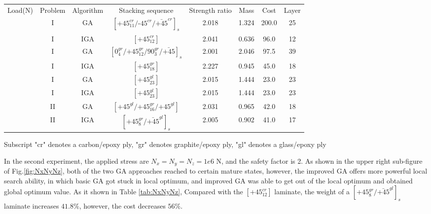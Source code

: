 \documentclass[smallextended]{svjour3}       %
\begin{document}
\begin{center}  
	\begin{tabular}{cccccccc}
	\toprule
	Load(N)                                                 &  Problem  &   Algorithm      & Stacking sequence                                    & Strength ratio  & Mass  &  Cost   & Layer    \\ 
	  &  I  & GA   &  $[\text{+}45_{11}^{cr}/\text{-}45^{cr}/\bar{\text{+}45}^{cr}]_s$                            & 2.018           & 1.324 &  200.0  & 25  \\
	                                                                             &  I  & IGA  &  $[\text{+}45_{12}^{cr}]$                            & 2.041           & 0.636 &  96.0  & 12  \\

																				 &  I  & GA   &  $[0_4^{gr}/\text{+}45_{12}^{gr}/90_3^{gr}/\bar{\text{+}45}]_s$                            & 2.001           & 2.046 &  97.5  & 39  \\
																				 &  I  & IGA  &  $[\text{+}45_{18}^{gr}]$                            & 2.227           & 0.945 &  45.0  & 18  \\
																				 &  I  & GA   &  $[\text{+}45_{23}^{gl}]$                            & 2.015           & 1.444 &  23.0  & 23  \\
																				 &  I  & IGA  &  $[\text{+}45_{23}^{gl}]$                            & 2.015           & 1.444 &  23.0  & 23  \\
																				 &  II &  GA  &  $[\text{+}45^{gl}/\text{+}45_{16}^{gr}/\text{+}45^{gl}]$          & 2.031           & 0.965 &  42.0  & 18 \\
																				 &  II & IGA  &  $[\text{+}45_8^{gr}/\bar{\text{+}45}^{gl}]_s$          & 2.005           & 0.902 &  41.0  & 17 \\
	\bottomrule
\end{tabular}
\label{tab:NxNyNz}
\begin{tablenotes}\footnotesize
     Subscript "cr" denotes a carbon/epoxy ply, "gr" denotes graphite/epoxy ply, "gl" denotes a
	glass/epoxy ply
\end{tablenotes}
\end{center}
In the second experiment, the applied stress are $N_x=N_y=N_z = 1e6$ N, and the
safety factor is 2.  As shown in the upper right sub-figure of
Fig.\ref{fig:NxNyNz}, both of the two GA approaches reached to certain mature
states, however, the improved GA offers more powerful local search ability, in
which basic GA got stuck in local optimum, and improved GA was able to get out
of the local optimum and obtained global optimum value. As it shown in Table
\ref{tab:NxNyNz}, Compared with the $[\text{+}45_{12}^{cr}]$ laminate, the
weight of a $[\text{+}45_8^{gr}/\bar{\text{+}45}^{gl}]_s$ laminate increases
$41.8\%$, however, the cost decreases $56\%$.
\end{document}
